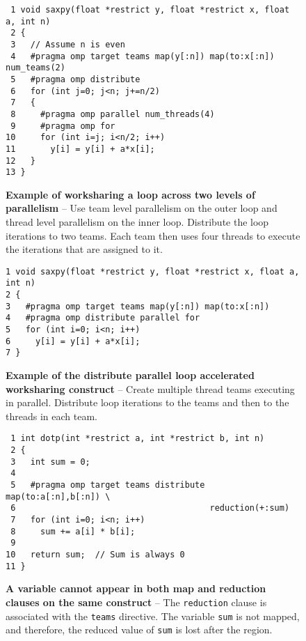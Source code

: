 \begin{figure*}[!tbh]
\begin{verbatim}
 1 void saxpy(float *restrict y, float *restrict x, float a, int n)
 2 {
 3   // Assume n is even
 4   #pragma omp target teams map(y[:n]) map(to:x[:n]) num_teams(2) 
 5   #pragma omp distribute
 6   for (int j=0; j<n; j+=n/2)
 7   {
 8     #pragma omp parallel num_threads(4)
 9     #pragma omp for
10     for (int i=j; i<n/2; i++)
11       y[i] = y[i] + a*x[i];
12   }
13 }
\end{verbatim}
\caption{ \textbf {Example of worksharing a loop across two levels of
                   parallelism} -- \small
          Use team level parallelism on the outer loop and thread level
          parallelism on the inner loop.  Distribute the loop iterations to two
          teams.  Each team then uses four threads to execute the iterations
          that are assigned to it.  
         }
\label{figure:chapter6-distribute-v2}
\end{figure*}


\begin{figure*}[!tbh]
\begin{verbatim}
1 void saxpy(float *restrict y, float *restrict x, float a, int n)
2 {
3   #pragma omp target teams map(y[:n]) map(to:x[:n]) 
4   #pragma omp distribute parallel for
5   for (int i=0; i<n; i++)
6     y[i] = y[i] + a*x[i];
7 }
\end{verbatim}
\caption{ \textbf {Example of the distribute parallel loop accelerated 
                   worksharing construct} -- \small
          Create multiple thread teams executing in parallel.
          Distribute loop iterations to the teams and then
          to the threads in each team.
         }
\label{figure:chapter6-distribute-v3}
\end{figure*}


\begin{figure*}[!tbh]
\begin{verbatim}
 1 int dotp(int *restrict a, int *restrict b, int n)
 2 {
 3   int sum = 0;
 4 
 5   #pragma omp target teams distribute map(to:a[:n],b[:n]) \
 6                                       reduction(+:sum)
 7   for (int i=0; i<n; i++)
 8     sum += a[i] * b[i];
 9 
10   return sum;  // Sum is always 0
11 }
\end{verbatim}
\caption{ \textbf {A variable cannot appear in both map and reduction clauses on the same construct} -- \small
          The \texttt{reduction} clause is associated with the
          \texttt{teams} directive.
          The variable \texttt{sum} is not mapped, and therefore,
          the reduced value of \texttt{sum} is lost after the region.
        }
\label{figure:chapter6-targetteams-reduction}
\end{figure*}


